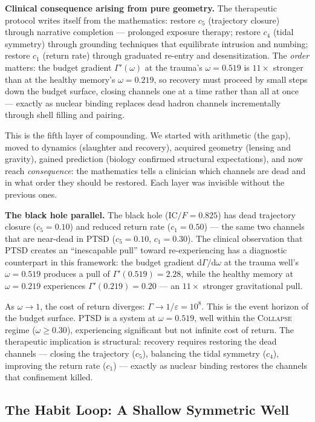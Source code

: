 \documentclass[
  aps,
  prd,
  twocolumn,
  superscriptaddress,
  nofootinbib,
  floatfix
]{revtex4-2}
\newcommand{\Gam}{\Gamma}
\newcommand{\eps}{\varepsilon}
\newcommand{\dd}{\mathrm{d}}
\newcommand{\regime}[1]{\textsc{#1}}
\newcommand{\IC}{\mathrm{IC}}
\begin{document}
\textbf{Clinical consequence arising from pure geometry.}
The therapeutic protocol writes itself from the
mathematics: restore $c_5$ (trajectory closure) through
narrative completion --- prolonged exposure therapy;
restore $c_4$ (tidal symmetry) through grounding techniques
that equilibrate intrusion and numbing; restore $c_1$
(return rate) through graduated re-entry and
desensitization.  The \emph{order} matters: the budget
gradient $\Gam'(\omega)$ at the trauma's $\omega = 0.519$
is $11\times$ stronger than at the healthy memory's
$\omega = 0.219$, so recovery must proceed by small steps
down the budget surface, closing channels one at a time
rather than all at once --- exactly as nuclear binding
replaces dead hadron channels incrementally through shell
filling and pairing.

This is the fifth layer of compounding.  We started with
arithmetic (the gap), moved to dynamics (slaughter and
recovery), acquired geometry (lensing and gravity), gained
prediction (biology confirmed structural expectations),
and now reach \emph{consequence}: the mathematics tells a
clinician which channels are dead and in what order they
should be restored.  Each layer was invisible without the
previous ones.

\textbf{The black hole parallel.}
The black hole ($\IC/F = 0.825$) has dead trajectory closure
($c_5 = 0.10$) and reduced return rate ($c_1 = 0.50$) ---
the same two channels that are near-dead in PTSD ($c_5 = 0.10$,
$c_1 = 0.30$).  The clinical observation that PTSD creates
an ``inescapable pull'' toward re-experiencing has a
diagnostic counterpart in this framework:
the budget gradient $\dd\Gam/\dd\omega$ at the trauma well's
$\omega = 0.519$ produces a pull of $\Gam'(0.519) = 2.28$,
while the healthy memory at $\omega = 0.219$ experiences
$\Gam'(0.219) = 0.20$ --- an $11\times$ stronger gravitational
pull.

As $\omega \to 1$, the cost of return diverges:
$\Gam \to 1/\eps = 10^8$.  This is the event horizon of the
budget surface.  PTSD is a system at $\omega = 0.519$, well
within the \regime{Collapse} regime ($\omega \geq 0.30$),
experiencing significant but not infinite cost of return.
The therapeutic implication is structural: recovery requires
restoring the dead channels --- closing the trajectory
($c_5$), balancing the tidal symmetry ($c_4$), improving
the return rate ($c_1$) --- exactly as nuclear binding
restores the channels that confinement killed.


\subsection{The Habit Loop: A Shallow Symmetric Well}
\end{document}
